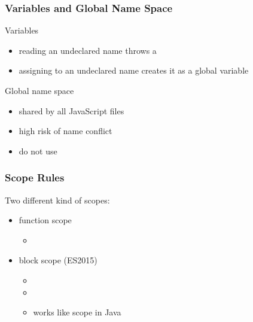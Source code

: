 \begin{frame}[fragile] \frametitle{Variables and Global Name Space}
Variables
\begin{itemize}
  \item reading an undeclared name throws a 
  \item assigning to an undeclared name creates it as a global variable
\end{itemize}

\vspace{3mm}
Global name space
\begin{itemize}
  \item shared by all JavaScript files
  \item high risk of name conflict
  \item do not use
\end{itemize}
\vspace{3mm}
\end{frame}

\begin{frame}[fragile] \frametitle{Scope Rules}
Two different kind of scopes:
\begin{itemize}
  \item  function scope
  \begin{itemize}
    \item {}
  \end{itemize}
  \item block scope (ES2015)
  \begin{itemize}
    \item {}
    \item {}
    \item works like scope in Java
  \end{itemize}
\end{itemize}
\vspace{4mm}

\end{frame}

